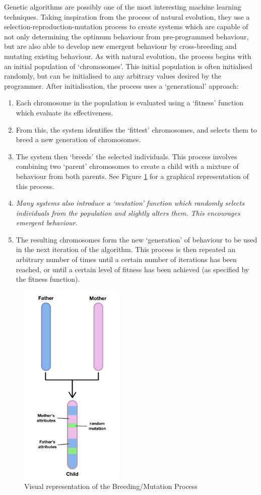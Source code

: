 \documentclass[a4paper,oneside]{report}
\begin{document}
Genetic algorithms are possibly one of the most interesting machine learning techniques. Taking inspiration from the process of natural evolution, they use a selection-reproduction-mutation process to create systems which are capable of not only determining the optimum behaviour from pre-programmed behaviour, but are also able to develop new emergent behaviour by cross-breeding and mutating existing behaviour. As with natural evolution, the process begins with an initial population of `chromosomes'. This initial population is often initialised randomly, but can be initialised to any arbitrary values desired by the programmer. After initialisation, the process uses a `generational' approach:

\begin{enumerate}
	\item Each chromosome in the population is evaluated using a `fitness' function which evaluate its effectiveness.
	\item From this, the system identifies the `fittest' chromosomes, and selects them to breed a new generation of chromosomes.
	\item The system then `breeds' the selected individuals. This process involves combining two `parent' chromosomes to create a child with a mixture of behaviour from both parents. See Figure \ref{fig:Breeding} for a graphical representation of this process.
	\item \emph{Many systems also introduce a `mutation' function which randomly selects individuals from the population and slightly alters them. This encourages emergent behaviour.}
	\item The resulting chromosomes form the new `generation' of behaviour to be used in the next iteration of the algorithm. This process is then repeated an arbitrary number of times until a certain number of iterations has been reached, or until a certain level of fitness has been achieved (as specified by the fitness function).
\end{enumerate}
  
\begin{figure}
	\centering
		\includegraphics[width=50mm]{sources/images/Evolution}
    	\caption{Visual representation of the Breeding/Mutation Process}
    	\label{fig:Breeding}
\end{figure}
\end{document}
